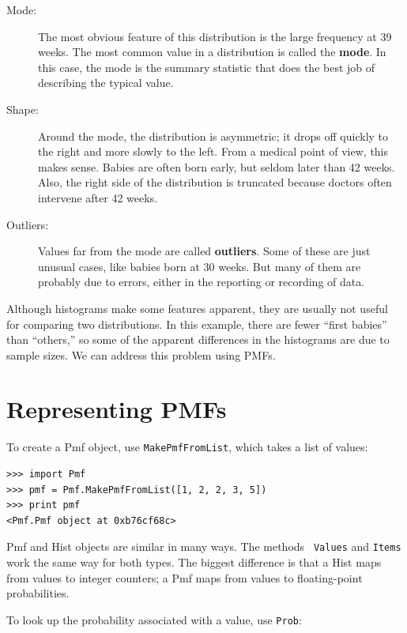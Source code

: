 \documentclass[12pt]{book}
\begin{document}
\begin{description}

\item[Mode:] The most obvious feature of this distribution is the
  large frequency at 39 weeks.  The most common value in a
  distribution is called the {\bf mode}.  In this case, the mode is
  the summary statistic that does the best job of describing the
  typical value.

\item[Shape:] Around the mode, the distribution is asymmetric; it
  drops off quickly to the right and more slowly to the left.  From a
  medical point of view, this makes sense.  Babies are often born
  early, but seldom later than 42 weeks.  Also, the right side of the
  distribution is truncated because doctors often intervene after 42
  weeks.

\item[Outliers:] Values far from the mode are called {\bf outliers}.
  Some of these are just unusual cases, like babies born at 30 weeks.
  But many of them are probably due to errors, either in the reporting
  or recording of data.

\end{description}

Although histograms make some features apparent, they are usually not
useful for comparing two distributions.  In this example, there are
fewer ``first babies'' than ``others,'' so some of the apparent
differences in the histograms are due to sample sizes.  We can
address this problem using PMFs.


\section{Representing PMFs}

To create a Pmf object, use {\tt MakePmfFromList}, which takes a list
of values:

\begin{verbatim}
>>> import Pmf
>>> pmf = Pmf.MakePmfFromList([1, 2, 2, 3, 5])
>>> print pmf
<Pmf.Pmf object at 0xb76cf68c>
\end{verbatim}

Pmf and Hist objects are similar in many ways.  The methods {\tt
  Values} and {\tt Items} work the same way for both types.  The
biggest difference is that a Hist maps from values to integer
counters; a Pmf maps from values to floating-point probabilities.

To look up the probability associated with a value, use {\tt Prob}:
\end{document}
